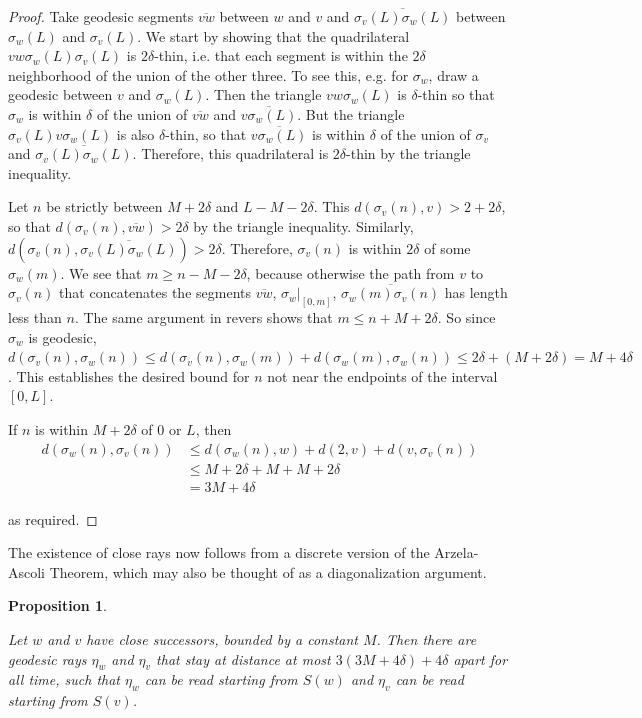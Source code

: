 \documentclass[10pt,a4paper]{amsart}
\newtheorem{proposition}[theorem]{Proposition}
\theoremstyle{definition}
\theoremstyle{remark}
\begin{document}
	\begin{proof}
		
		Take geodesic segments $\overline{vw}$ between $w$ and $v$ and $\overline{\sigma_v(L)\sigma_w(L)}$ between $\sigma_w(L)$ and $\sigma_v(L)$. We start by showing that the quadrilateral $v w \sigma_w(L)\sigma_v(L)$ is $2\delta$-thin, i.e. that each segment is within the $2\delta$ neighborhood of the union of the other three. To see this, e.g. for $\sigma_w$, draw a geodesic between $v$ and $\sigma_w(L)$. Then the triangle $v w \sigma_w(L)$ is $\delta$-thin so that $\sigma_w$ is within $\delta$ of the union of $\overline{vw}$ and $\overline{v\sigma_w(L)}$. But the triangle $\sigma_v(L) v \sigma_w(L)$ is also $\delta$-thin, so that $\overline{v\sigma_w(L)}$ is within $\delta$ of the union of $\sigma_v$ and $\overline{\sigma_v(L)\sigma_w(L)}$. Therefore, this quadrilateral is $2\delta$-thin by the triangle inequality.
		
		Let $n$ be strictly between $M+2\delta$ and $L-M-2\delta$.	This $d(\sigma_v(n), v)>2+2\delta$, so that $d(\sigma_v(n), \overline{vw})>2\delta$ by the triangle inequality. Similarly, $d(\sigma_v(n),\overline{\sigma_v(L)\sigma_w(L)})>2\delta$. Therefore, $\sigma_v(n)$ is within $2\delta$ of some $\sigma_w(m)$. We see that $m\ge n-M-2\delta$, because otherwise the path from $v$ to $\sigma_v(n)$ that concatenates the segments $\overline{vw}$, $\sigma_w|_{[0,m]}$, $\overline{\sigma_w(m)\sigma_v(n)}$ has length less than $n$. The same argument in revers shows that $m\le n+M+2\delta$. So since $\sigma_w$ is geodesic, $d(\sigma_v(n),\sigma_w(n))\le d(\sigma_v(n),\sigma_w(m))+d(\sigma_w(m),\sigma_w(n))\le 2\delta+(M+2\delta)=M+4\delta$. This establishes the desired bound for $n$ not near the endpoints of the interval $[0,L]$.
		
		If $n$ is within $M+2\delta$ of $0$ or $L$, then \begin{align*}
		d(\sigma_w(n),\sigma_v(n))&\le d(\sigma_w(n),w)+d(2,v)+d(v,\sigma_v(n))\\
		&\le M+2\delta+M+M+2\delta\\
		&=3M+4\delta
		\end{align*}
		
		as required.
	\end{proof}
	
	The existence of close rays now follows from a discrete version of the Arzela-Ascoli Theorem, which may also be thought of as a diagonalization argument.
	
	\begin{proposition} \label{CloseSuccessorRays}
		
		Let $w$ and $v$ have close successors, bounded by a constant $M$. Then there are geodesic rays $\eta_w$ and $\eta_v$ that stay at distance at most $3(3M+4\delta)+4\delta$ apart for all time, such that $\eta_w$ can be read starting from $S(w)$ and $\eta_v$ can be read starting from $S(v)$. 
		
	\end{proposition}
	
\end{document}
